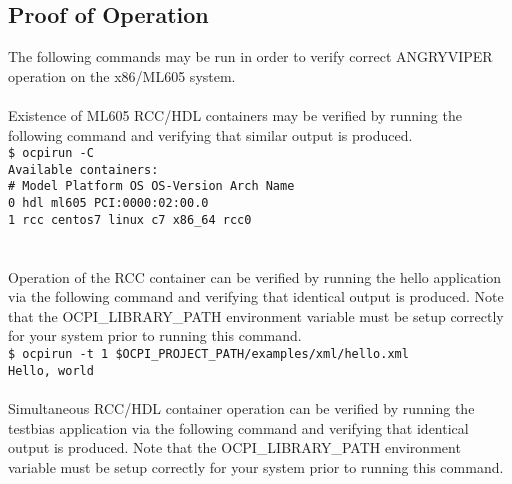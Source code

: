 \documentclass{article}
\newcommand{\terminaloutput}[1]{\texttt{#1}}
\begin{document}
\subsection*{Proof of Operation}
The following commands may be run in order to verify correct ANGRYVIPER operation on the x86/ML605 system.\\ \\
Existence of ML605 RCC/HDL containers may be verified by running the following command and verifying that similar output is produced.\\
\noindent\terminaloutput{\$ ocpirun -C\\
Available containers:\\
 \#  Model\hspace{6ex} Platform\hspace{3ex}    OS\hspace{5ex}     OS-Version\hspace{1ex}  Arch\hspace{3ex} Name\\
 0  hdl\hspace{9ex}   ml605\hspace{39ex} PCI:0000:02:00.0\\
 1  rcc\hspace{9ex}   centos7\hspace{4ex}      linux\hspace{2ex}  c7\hspace{10ex}          x86\_64\hspace{1ex} rcc0\\
}\\ \\
Operation of the RCC container can be verified by running the hello application via the following command and verifying that identical output is produced. Note that the OCPI\_LIBRARY\_PATH environment variable must be setup correctly for your system prior to running this command.\\
\noindent\terminaloutput{\$ ocpirun -t 1 \$OCPI\_PROJECT\_PATH/examples/xml/hello.xml \\
Hello, world} \\ \\
Simultaneous RCC/HDL container operation can be verified by running the testbias application via the following command and verifying that identical output is produced. Note that the OCPI\_LIBRARY\_PATH environment variable must be setup correctly for your system prior to running this command.\\
\end{document}
